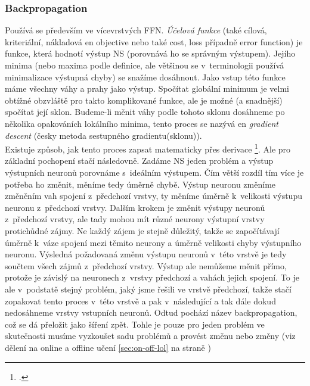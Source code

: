 \documentclass[12pt]{report}			%
\newcommand{\doubleref}[1]{\ref{#1} na straně \pageref{#1}}
\begin{document}
	\subsubsection{Backpropagation}
	\label{sec:BP}
	Používá se především ve vícevrstvých \gls{FFN}. \emph{Účelová funkce} (také cílová, kriteriální, nákladová \gls{en} objective nebo také cost, loss případně error function) \parencite[\gls{s} 77]{NN_introduction-Kriessel} \parencite[\gls{s} 733]{AIAMA} \parencite{wiki:ucelova-funkce} \parencite[\gls{k} 1.5]{NN-Nielsen-web} je funkce, která hodnotí výstup \gls{NS} (porovnává ho se správným výstupem). Jejího minima (nebo maxima podle definice, ale většinou se v~terminologii  používá minimalizace výstupná chyby) se snažíme dosáhnout. Jako vstup této funkce máme všechny váhy a prahy jako výstup. Spočítat globální minimum je velmi obtížné obzvláště pro takto komplikované funkce, ale je možné (a snadnější) spočítat její sklon. Budeme-li měnit váhy podle tohoto sklonu dosáhneme po několika opakováních lokálního minima, tento proces se nazývá \gls{en} \emph{gradient descent} (česky metoda sestupného gradientu(sklonu)).\parencite{3B1B-ch2}\\
	Existuje způsob, jak tento proces zapsat matematicky přes derivace \footcite[Anglicky s~pěkným grafickým znázorněním to popisuje Backpropagation calculus | Deep learning, chapter 4 od 3Blue1Brown na stránce YouTube]{3B1B-ch4}. Ale pro základní pochopení stačí následovně. Zadáme \gls{NS} jeden problém a výstup výstupních neuronů porovnáme s~ideálním výstupem. Čím větší rozdíl tím více je potřeba ho změnit, měníme tedy úměrně chybě. Výstup neuronu změníme změněním vah spojení z~předchozí vrstvy, ty měníme úměrně k~velikosti výstupu neuronu z~předchozí vrstvy. Dalším krokem je změnit výstupy neuronů z~předchozí vrstvy, ale tady mohou mít různé neurony výstupní vrstvy protichůdné zájmy. Ne každý zájem je stejně důležitý, takže se započítávají úměrně k~váze spojení mezi těmito neurony a úměrně velikosti chyby výstupního neuronu. Výsledná požadovaná změnu výstupu neuronů v~této vrstvě je tedy součtem všech zájmů z~předchozí vrstvy. Výstup ale nemůžeme měnit přímo, protože je závislý na neuronech z~vrstvy předchozí a vahách jejich spojení. To je ale v~podstatě stejný problém, jaký jsme řešili ve vrstvě předchozí, takže stačí zopakovat tento proces v~této vrstvě a pak v~následující a tak dále dokud nedosáhneme vrstvy vstupních neuronů. Odtud pochází název backpropagation, což se dá přeložit jako šíření zpět. Tohle je pouze pro jeden problém ve skutečnosti musíme vyzkoušet sadu problémů  a provést změnu nebo změny (\gls{viz} dělení na online a offline učení \doubleref{sec:on-off-lol}) \parencite{3B1B-ch3}
	
\end{document}
